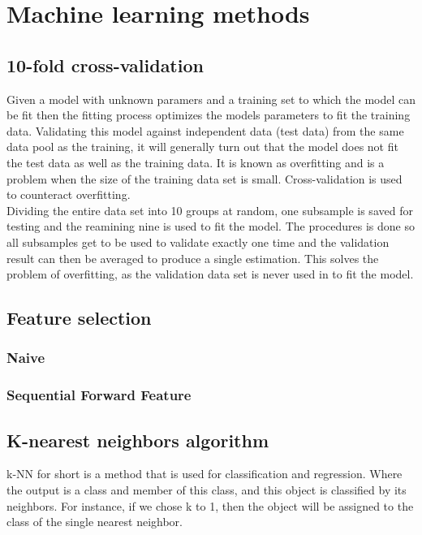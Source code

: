 \section{Machine learning methods}

\subsection{10-fold cross-validation}
Given a model with unknown paramers and a training set to which the model can be fit then the fitting process optimizes the models parameters to fit the training data. Validating this model against independent data (test data) from the same data pool as the training, it will generally turn out that the model does not fit the test data as well as the training data. It is known as overfitting and is a problem when the size of the training data set is small. Cross-validation is used to counteract overfitting.\\

Dividing the entire data set into 10 groups at random, one subsample is saved for testing and the reamining nine is used to fit the model. The procedures is done so all subsamples get to be used to validate exactly one time and the validation result can then be averaged to produce a single estimation. This solves the problem of overfitting, as the validation data set is never used in to fit the model.



\subsection{Feature selection}

\subsubsection{Naive}

\subsubsection{Sequential Forward Feature}

\subsection{K-nearest neighbors algorithm}

k-NN for short is a method that is used for classification and regression. Where the output is a class and member of this class, and this object is classified by its neighbors. For instance, if we chose k to 1, then the object will be assigned to the class of the single nearest neighbor.

